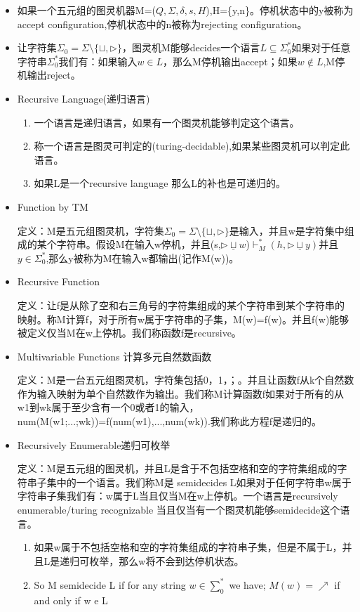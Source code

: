 \documentclass[UTF8]{ctexart}
\begin{document}
\begin{itemize}
    \item 如果一个五元组的图灵机器M=($Q,\Sigma ,\delta ,s,H$),H=\{y,n\}。停机状态中的y被称为accept configuration,停机状态中的n被称为rejecting configuration。
    \item 让字符集$\Sigma_0=\Sigma \setminus \{\sqcup ,\rhd \}$，图灵机M能够decides一个语言$L\subseteq \Sigma_0^{*}$如果对于任意字符串$\Sigma_0^{*}$我们有：如果输入$w \in L$，那么M停机输出accept；如果$w \notin L$,M停机输出reject。
    \item Recursive Language(递归语言)
    \begin{enumerate}
        \item 一个语言是递归语言，如果有一个图灵机能够判定这个语言。
        \item 称一个语言是图灵可判定的(turing-decidable),如果某些图灵机可以判定此语言。
        \item 如果L是一个recursive language 那么L的补也是可递归的。
    \end{enumerate}
    \item Function by TM
    
    定义：M是五元组图灵机，字符集$\Sigma_0=\Sigma \setminus \{\sqcup ,\rhd \}$是输入，并且w是字符集中组成的某个字符串。假设M在输入w停机，并且(s,$\rhd \underline{\sqcup} w$)$\vdash_M^{*}$$(h,\rhd \underline{\sqcup} y)$并且$y \in \Sigma_{0}^{*}$,那么y被称为M在输入w都输出(记作M(w))。
    \item Recursive Function
    
    定义：让f是从除了空和右三角号的字符集组成的某个字符串到某个字符串的映射。称M计算f，对于所有w属于字符串的子集，M(w)=f(w)。并且f(w)能够被定义仅当M在w上停机。我们称函数f是recursive。
    
    \item Multivariable Functions 计算多元自然数函数
    
    定义：M是一台五元组图灵机，字符集包括0，1，；。并且让函数f从k个自然数作为输入映射为单个自然数作为输出。我们称M计算函数f如果对于所有的从w1到wk属于至少含有一个0或者1的输入，num(M(w1;...;wk))=f(num(w1),...,num(wk)).我们称此方程f是递归的。

    \item Recursively Enumerable递归可枚举
    
    定义：M是五元组的图灵机，并且L是含于不包括空格和空的字符集组成的字符串子集中的一个语言。我们称M是 semidecides L如果对于任何字符串w属于字符串子集我们有：w属于L当且仅当M在w上停机。一个语言是recursively enumerable/turing recognizable 当且仅当有一个图灵机能够semidecide这个语言。
    \begin{enumerate}
        \item 如果w属于不包括空格和空的字符集组成的字符串子集，但是不属于L，并且L是递归可枚举，那么w将不会到达停机状态。
        \item So M semidecide L if for any string \(w \in \sum _{0}^{*}\) we have; \(M(w)=\nearrow\) if and only if w e L
    \end{enumerate}


\end{itemize}
\end{document}
